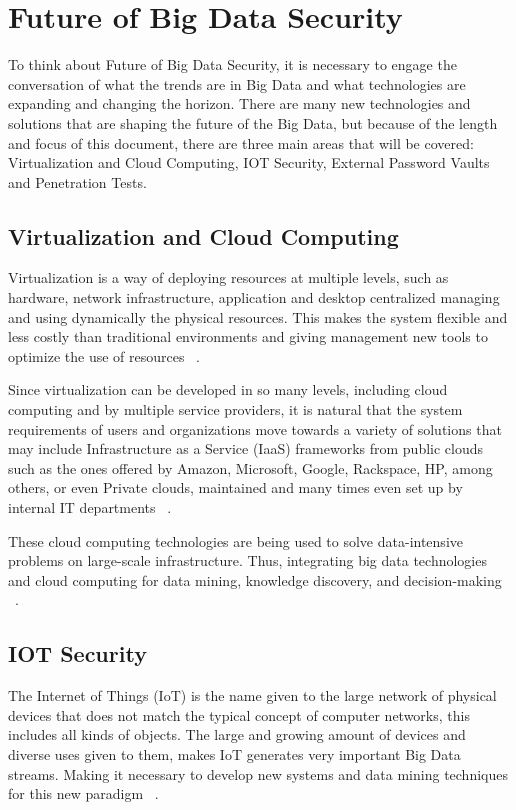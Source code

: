 \documentclass[sigconf]{acmart}
\begin{document}
\section{Future of Big Data Security}
To think about Future of Big Data Security, it is necessary to engage the conversation of what the trends are in Big Data and what technologies are expanding and changing the horizon.
There are many new technologies and solutions that are shaping the future of the Big Data, but because of the length and focus of this document, there are three main areas that will be covered: Virtualization and Cloud Computing, IOT Security, External Password Vaults and Penetration Tests.

\subsection{Virtualization and Cloud Computing}

Virtualization is a way of deploying resources at multiple levels, such as hardware, network infrastructure, application and desktop centralized managing and using dynamically the physical resources. This makes the system flexible and less costly than traditional environments and giving management new tools to optimize the use of resources ~\cite{padmini2015securing}.

Since virtualization can be developed in so many levels, including cloud computing and by multiple service providers, it is natural that the system requirements of users and organizations move towards a variety of solutions that may include Infrastructure as a Service (IaaS) frameworks from public clouds such as the ones offered by Amazon, Microsoft, Google, Rackspace, HP, among others, or even Private clouds, maintained and many times even set up by internal IT departments ~\cite{von2014accessing}.

These cloud computing technologies are being used to solve data-intensive problems on large-scale infrastructure. Thus, integrating big data technologies and cloud computing for data  mining, knowledge discovery, and decision-making ~\cite{kune2016anatomy}.

\subsection{IOT Security}

The Internet of Things (IoT) is the name given to the large network of physical devices that does not match the typical concept of computer networks, this includes all kinds of objects. The large and growing amount of devices and diverse uses given to them, makes IoT generates very important Big Data streams. Making it necessary to develop new systems and data mining techniques for this new paradigm ~\cite{bifet2016mining}.
\end{document}
